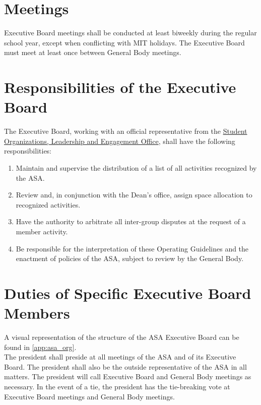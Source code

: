 \documentclass[12pt]{constitution}
\begin{document}
\section{Meetings}
Executive Board meetings shall be conducted at least biweekly during the regular school year, except
    when conflicting with MIT holidays.
The Executive Board must meet at least once between General Body meetings.

\section{Responsibilities of the Executive Board}
The Executive Board, working with an official representative from the
    \href{https://studentlife.mit.edu/life-campus/campus-student-activities/student-organizations-leadership-and-engagement}{Student Organizations, Leadership and Engagement Office},
    shall have the following responsibilities:
\begin{enumerate}
    \item Maintain and supervise the distribution of a list of all activities recognized by the ASA.
    
    \item Review and, in conjunction with the Dean's office, assign space allocation to
        recognized activities.
    
    \item Have the authority to arbitrate all inter-group disputes at the request of a member activity.
    
    \item Be responsible for the interpretation of these Operating Guidelines and the enactment of
        policies of the ASA, subject to review by the General Body.
\end{enumerate}

\section{Duties of Specific Executive Board Members}
A visual representation of the structure of the ASA Executive Board can be found in \ref{app:asa_org}.
\\

The president shall preside at all meetings of the ASA and of its Executive Board.
The president shall also be the outside representative of the ASA in all matters.
The president will call Executive Board and General Body meetings as necessary.
In the event of a tie, the president has the tie-breaking vote at Executive Board meetings and General Body meetings.
\\
\end{document}
